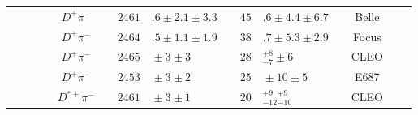 \begin{adjustbox}{width=0.76\textwidth,center}
{\begin{tabular}{cp{5pt}cp{5pt}cp{5pt}r@{}lp{5pt}r@{}lp{5pt}cp{5pt}c}
		                                         &                  &                              &                  & $D^{+}\pi^{-}$                  &                       & $	2461$                       & $.6\pm2.1\pm3.3	$                             &                       & $	45$                                            & $.6\pm4.4\pm6.7	$                            &                       & Belle                                                         &                       & \cite{Abe:2003zm}                         \\
		                                         &                  &                              &                  & $D^{+}\pi^{-}$                  &                       & $	2464$                       & $.5\pm1.1\pm1.9	$                             &                       & $	38$                                            & $.7\pm5.3\pm2.9	$                            &                       & Focus                                                         &                       & \cite{Link:2003bd}                        \\
		                                         &                  &                              &                  & $D^{+}\pi^{-}$                  &                       & $	2465$                       & ${}\pm3\pm3	$                                 &                       & $	28$                                            & ${}^{+8}_{-7}\pm6	$                          &                       & CLEO                                                          &                       & \cite{Avery:1994yc}                       \\
		                                         &                  &                              &                  & $D^{+}\pi^{-}$                  &                       & $	2453$                       & ${}\pm3\pm2	$                                 &                       & $	25$                                            & ${}\pm10\pm5	$                               &                       & E687                                                          &                       & \cite{Frabetti:1993vv}                    \\
		                                         &                  &                              &                  & $D^{*+}\pi^{-}$                 &                       & $	2461$                       & ${}\pm3\pm1	$                                 &                       & $	20$                                            & ${}^{+9}_{-12}{}^{+9}_{-10}	$                &                       & CLEO                                                          &                       & \cite{Avery:1989ui}                       \\

\end{tabular}}
\end{adjustbox}

